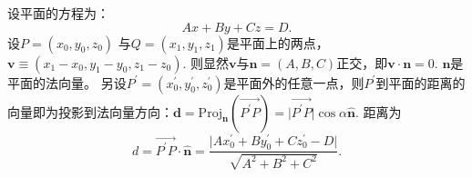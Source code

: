 \documentclass{article}
\begin{document}
\begin{tcolorbox}[colback=white, arc=3mm, auto outer arc]
\begin{minipage}[c,t]{1.0\textwidth}
\kaishu
设平面的方程为：
\begin{equation*}
    Ax+By+Cz=D.
\end{equation*}
设$P=(x_{0}, y_{0}, z_{0})$ 与$Q=(x_{1}, y_{1}, z_{1})$是平面上的两点，$\mathbf{v}\equiv(x_{1}-x_{0}, y_{1}-y_{0}, z_{1}-z_{0})$.
则显然$\mathbf{v}$与$\mathbf{n}=(A, B, C)$正交，即$\mathbf{v}\cdot\mathbf{n}=0$.
$\mathbf{n}$是平面的法向量。
另设$P^{\prime}=(x_{0}^{\prime}, y_{0}^{\prime}, z_{0}^{\prime})$是平面外的任意一点，则$P^{\prime}$到平面的距离的向量即为投影到法向量方向：$    \mathbf{d}=\text{Proj}_{\mathbf{n}}\left(\overrightarrow{P^{\prime}P}\right)=\vert\overrightarrow{P^{\prime}P}\vert\cos\alpha\hat{\mathbf{n}}$.
距离为
\begin{equation*}
d=\overrightarrow{P^{\prime}P}\cdot\hat{\mathbf{n}}
=\frac{\vert Ax_{0}^{\prime}+By_{0}^{\prime}+Cz_{0}^{\prime}-D\vert}{\sqrt{A^{2}+B^{2}+C^{2}}}.
\end{equation*}
\end{minipage}
\end{tcolorbox}

%
%
\end{document}
